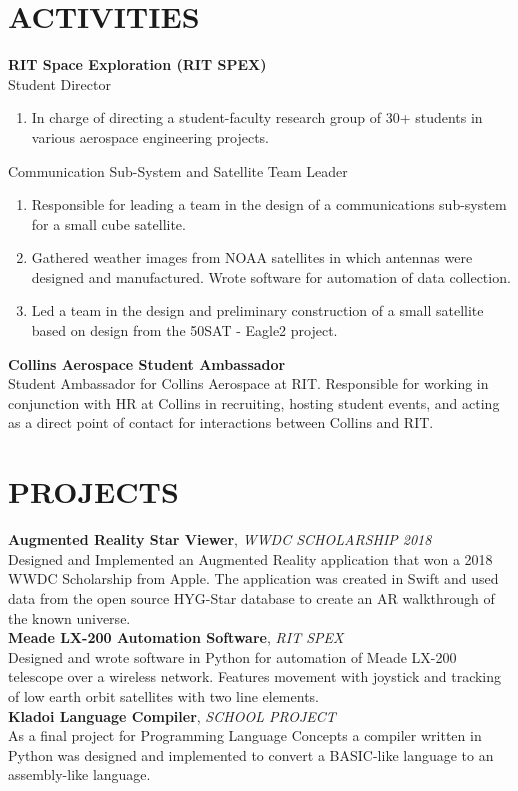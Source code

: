 \documentclass[line, margin]{res}
\begin{document}
\begin{resume}
\section{ACTIVITIES}
\textbf{RIT Space Exploration (RIT SPEX)}\\
Student Director
	\begin{enumerate}
		\item[]In charge of directing a student-faculty research group of 30+ students in various aerospace engineering projects. 
	\end{enumerate}
      
Communication Sub-System and  Satellite Team Leader
      \begin{enumerate}
        \item[] Responsible for leading a team in the design of a communications sub-system for a small cube satellite.
        \item[] Gathered weather images from NOAA satellites in which antennas were designed and manufactured. Wrote software for automation of data collection.
        \item[] Led a team in the design and preliminary construction of a small satellite based on design from the \textdollar 50SAT - Eagle2 project.
      \end{enumerate}
      

\textbf{Collins Aerospace Student Ambassador}\\
Student Ambassador for Collins Aerospace at RIT.  Responsible for working in conjunction with HR at Collins in recruiting, hosting student events, and acting as a direct point of contact for interactions between Collins and RIT.
      
      
\section{PROJECTS}
\textbf{Augmented Reality Star Viewer}, \textit{WWDC SCHOLARSHIP 2018}\\
Designed and Implemented an Augmented Reality application that won a 2018 WWDC Scholarship from Apple.  The application was created in Swift and used data from the open source HYG-Star database to create an AR walkthrough of the known universe.
\\ [10pt]
\textbf{Meade LX-200 Automation Software}, \textit{RIT SPEX}\\
Designed and wrote software in Python for automation of Meade LX-200 telescope over a wireless network.  Features movement with joystick and tracking of low earth orbit satellites with two line elements.
\\ [10pt]
\textbf{Kladoi Language Compiler}, \textit{SCHOOL PROJECT}\\
As a final project for Programming Language Concepts a compiler written in Python was designed and implemented to convert a BASIC-like language to an assembly-like language.



\end{resume}
\end{document}
